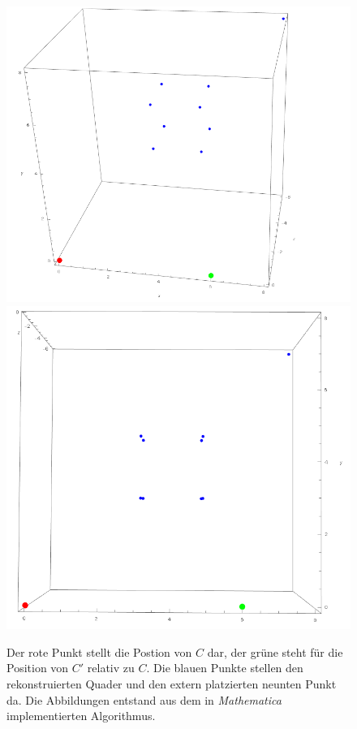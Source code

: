 \begin{figure}[!htb]
	\includegraphics[width=\linewidth]{images/MinimalBeispiel_reconstructed.png}
	\endminipage\hfill
	\includegraphics[width=\linewidth]{images/MinimalBeispiel_reconstructed_3.png}
	\endminipage\hfill
	\caption[Programmplot der rekonstruierten Szene]{Der rote Punkt stellt die Postion von $C$ dar, der grüne steht für die Position von $C'$ relativ zu $C$. Die blauen Punkte stellen den rekonstruierten Quader und den extern platzierten neunten Punkt da. Die Abbildungen entstand aus dem in \textit{Mathematica}\cite{Mathematica} implementierten Algorithmus.}
		\label{fig:Quader1}
\end{figure}
\pagebreak


